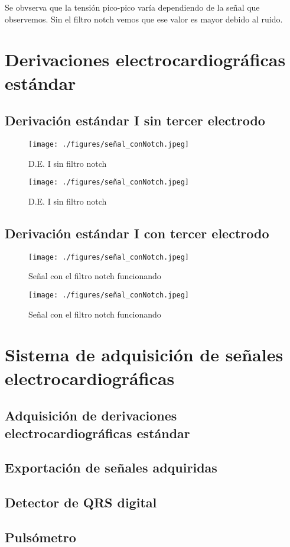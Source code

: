 \documentclass[conference]{IEEEtran}
\begin{document}
Se obvserva que la tensión pico-pico varía dependiendo de la señal que observemos. Sin el filtro notch vemos que ese valor es mayor debido al ruido.

\section{Derivaciones electrocardiográficas estándar}
\subsection{Derivación estándar I sin tercer electrodo}
 
\begin{figure}[htbp]
    \centerline{\texttt{[image: ./figures/señal\_conNotch.jpeg]}}
    \caption{D.E. I sin filtro notch}
    \label{s_conNotch}
    \end{figure}
 
\begin{figure}[htbp]
    \centerline{\texttt{[image: ./figures/señal\_conNotch.jpeg]}}
    \caption{D.E. I sin filtro notch}
    \label{s_conNotch}
    \end{figure}

\subsection{Derivación estándar I con tercer electrodo}
\begin{figure}[htbp]
    \centerline{\texttt{[image: ./figures/señal\_conNotch.jpeg]}}
    \caption{Señal con el filtro notch funcionando}
    \label{s_conNotch}
    \end{figure}

\begin{figure}[htbp]
    \centerline{\texttt{[image: ./figures/señal\_conNotch.jpeg]}}
    \caption{Señal con el filtro notch funcionando}
    \label{s_conNotch}
    \end{figure}
    
\section{Sistema de adquisición de señales electrocardiográficas}
\subsection{Adquisición de derivaciones electrocardiográficas estándar}

\subsection{Exportación de señales adquiridas}

\subsection{Detector de QRS digital}

\subsection{Pulsómetro}
\end{document}
